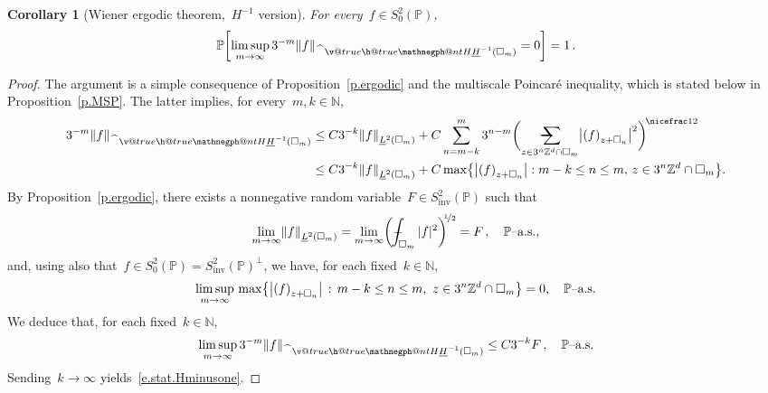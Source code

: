 \documentclass[11pt,twoside]{article} %
\makeatletter
\let\oldsquare\square %
\renewcommand{\square}{\oldsquare}
\numberwithin{equation}{section}
\newtheorem{corollary}[theorem]{Corollary}
\theoremstyle{definition}
\let\originalleft\left
\let\originalright\right
\renewcommand{\left}{\mathopen{}\mathclose\bgroup\originalleft}
\renewcommand{\right}{\aftergroup\egroup\originalright}
\newcommand*{\N}{\ensuremath{\mathbb{N}}}
\newcommand*{\Zd}{\ensuremath{\mathbb{Z}^d}}
\renewcommand*{\hat}{\widehat}
\newcommand{\inv}{\mathrm{inv}}
\newcommand{\cu}{\square}
\renewcommand{\P}{\mathbb{P}}
\newcommand{\avsum}{\mathop{\mathpalette\avsuminner\relax}\displaylimits}
\newcommand\avsuminner[2]{%
  {\sbox0{$\m@th#1\sum$}%
   \vphantom{\usebox0}%
   \ooalign{%
     \hidewidth
     \smash{\,\rule[.23em]{8.8pt}{1.1pt} \relax}%
     \hidewidth\cr
   ~$\m@th#1\sum$\cr
   }%
  }%
}
\def\Xint#1{\mathchoice
{\XXint\displaystyle\textstyle{#1}}%
{\XXint\textstyle\scriptstyle{#1}}%
{\XXint\scriptstyle\scriptscriptstyle{#1}}%
{\XXint\scriptscriptstyle\scriptscriptstyle{#1}}%
\!\int}
\def\XXint#1#2#3{{\setbox0=\hbox{$#1{#2#3}{\int}$}
\vcenter{\hbox{$#2#3$}}\kern-.5\wd0}}
\def\fint{\Xint-}
\newcommand{\negphantom}{\v@true\h@true\negph@nt}
\newcommand{\negph@nt}{\ifmmode\expandafter\mathpalette 
  \expandafter\mathnegph@nt\else\expandafter\makenegph@nt\fi}
\newcommand{\makenegph@nt}[1]{%
  \setbox\z@\hbox{\color@begingroup#1\color@endgroup}\finnegph@nt}
\newcommand{\finnegph@nt}{%
  \setbox\tw@\null 
  \ifv@ \ht\tw@\ht\z@\dp\tw@\dp\z@\fi \ifh@\wd\tw@-\wd\z@\fi\box\tw@}
\newcommand{\mathnegph@nt}[2]{%
  \setbox\z@\hbox{$\m@th #1{#2}$}\finnegph@nt}
\newcommand{\Hminusul}{\hat{\phantom{H}}\negphantom{H}\underline{H}^{-1}}
\makeatother
\begin{document}
\begin{corollary}[Wiener ergodic theorem,~$H^{-1}$ version]
\label{c.stat.Hminusone}
For every~$f \in S^2_0(\P)$,
\begin{equation}
\label{e.stat.Hminusone}
\P \biggl[
\limsup_{m\to \infty} 
3^{-m}\left\| f   \right\|_{\Hminusul(\cu_m)} 
= 0
\biggr] = 1
\,.
\end{equation}
\end{corollary}
\begin{proof}
The argument is a simple consequence of Proposition~\ref{p.ergodic} and the 
multiscale Poincar\'e inequality, which is stated below in Proposition~\ref{p.MSP}.
The latter implies,  for every~$m,k\in\N$,
\begin{align*}
3^{-m} \left\| f \right\|_{\Hminusul(\cu_{m})} 
&
\leq
C3^{-k} \left\| f \right\|_{\underline{L}^2(\cu_{m})}
+
C\sum_{n=m-k}^{m}
3^{n-m}
\biggl( \avsum_{z\in 3^n\Zd \cap \cu_{m}} \left| \left( f \right)_{z+\cu_n} \right|^2 \biggr)^{\!\nicefrac12}
\\ & 
\leq 
C3^{-k} \left\| f \right\|_{\underline{L}^2(\cu_{m})}
+
C \max \bigl\{ 
\left| \left( f \right)_{z+\cu_n} \right|  : m-k\leq n \leq m, \, z\in 3^n\Zd\cap \cu_{m} \bigr\}.
\end{align*}
By Proposition~\ref{p.ergodic}, there exists a nonnegative random variable~$F \in S^2_{\mathrm{inv}}(\P)$ such that 
\begin{equation*}
\lim_{m\to \infty} \left\| f \right\|_{\underline{L}^2(\cu_m)} = 
\lim_{m\to \infty} \biggl( \fint_{\cu_m} |f|^2 \biggr)^{\!\!\nicefrac12}
= F \,,
\quad \mbox{$\P$--a.s.,} 
\end{equation*}
and, using also that~$f \in S_0^2(\P)= S^2_{\inv}(\P)^\perp$, we have, for each fixed~$k\in\N$, 
\begin{equation*}
\limsup_{m\to \infty} \, \max\left\{
\left| \left( f \right)_{z+\cu_n} \right| \,:\, m-k\leq n \leq m, \ z\in 3^n\Zd\cap \cu_{m} \right\}
= 0,
\quad \mbox{$\P$--a.s.}
\end{equation*}
We deduce that, for each fixed~$k\in\N$,
\begin{equation}
\limsup_{m\to\infty}
3^{-m}\left\| f \right\|_{\Hminusul(\cu_{m})} 
\leq 
C3^{-k} F\,, \quad \mbox{$\P$--a.s.}
\end{equation}
Sending~$k\to \infty$ yields~\eqref{e.stat.Hminusone}.
\end{proof}
\end{document}
